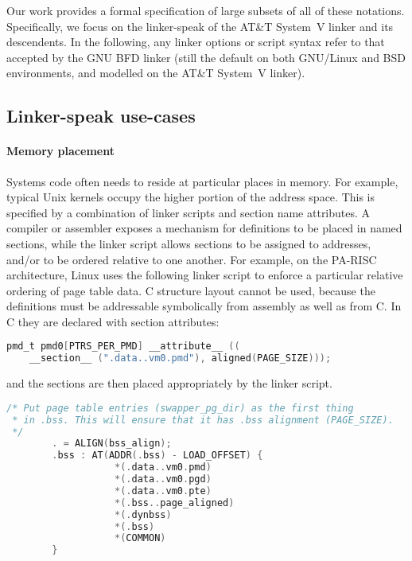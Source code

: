 \documentclass[preprint,10pt]{sigplanconf-pldi16}
\begin{document}
Our work provides a formal specification
of large subsets of all of these notations.
Specifically, we focus on the linker-speak of the AT\&T System~V linker
and its descendents. 
In the following, any linker options or script syntax
refer to that accepted by the GNU BFD linker
(still the default on both GNU/Linux and BSD environments, and 
modelled on the AT\&T System~V linker).

\subsection{Linker-speak use-cases}
\label{sec:linker-speak}

\paragraph{Memory placement}
Systems code often needs to reside at particular places in memory.
For example, typical Unix kernels occupy the higher portion of the address space.
This is specified by a combination of linker scripts and section name attributes. 
A compiler or assembler exposes a mechanism for definitions to be placed in named sections,
while the linker script allows sections to be assigned to addresses, 
and/or to be ordered relative to one another.
For example, on the PA-RISC architecture, Linux uses the following 
linker script to enforce a particular relative ordering of page table data.
C structure layout cannot be used, because the definitions must be addressable
symbolically from assembly as well as from C.
In C they are declared with section attributes:

{\scriptsize\begin{lstlisting}[language=C,columns=flexible,basicstyle=\sffamily]
pmd_t pmd0[PTRS_PER_PMD] __attribute__ ((
    __section__ (".data..vm0.pmd"), aligned(PAGE_SIZE)));
\end{lstlisting}}

\noindent
and the sections are then placed appropriately by the linker script.

{\scriptsize\begin{lstlisting}[language=C,columns=flexible,basicstyle=\sffamily]
/* Put page table entries (swapper_pg_dir) as the first thing 
 * in .bss. This will ensure that it has .bss alignment (PAGE_SIZE).
 */
        . = ALIGN(bss_align);                
        .bss : AT(ADDR(.bss) - LOAD_OFFSET) {
                   *(.data..vm0.pmd)
                   *(.data..vm0.pgd)
                   *(.data..vm0.pte)
                   *(.bss..page_aligned)     
                   *(.dynbss)                
                   *(.bss)                   
                   *(COMMON)                 
        }
\end{lstlisting}}
\end{document}
